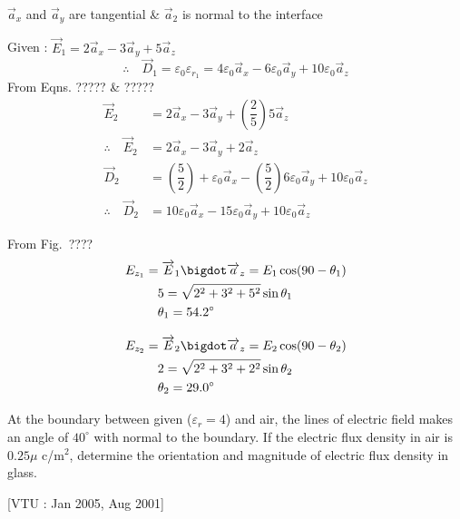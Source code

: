 \begin{solution}
$\overrightarrow{a}_{x}$ and $\overrightarrow{a}_{y}$ are tangential \& $\overrightarrow{a}_{2}$ is normal to the interface

Given : $\overrightarrow{E}_{1} = 2\overrightarrow{a}_{x} - 3\overrightarrow{a}_{y} + 5\overrightarrow{a}_{z}$
$$
\therefore\quad \overrightarrow{D}_{1} = \varepsilon_{0}\varepsilon_{r_{1}} = 4\varepsilon_{0}\overrightarrow{a}_{x} - 6\varepsilon_{0}\overrightarrow{a}_{y} + 10\varepsilon_{0}\overrightarrow{a}_{z}
$$
From Eqns. ????? \& ?????
\begin{align*}
\overrightarrow{E}_{2} & = 2\overrightarrow{a}_{x} - 3\overrightarrow{a}_{y} + \left(\dfrac{2}{5}\right) 5\overrightarrow{a}_{z}\\
\therefore\quad \overrightarrow{E}_{2} & = 2\overrightarrow{a}_{x} - 3\overrightarrow{a}_{y} + 2\overrightarrow{a}_{z}\\
\overrightarrow{D}_{2} & = \left(\dfrac{5}{2}\right) + \varepsilon_{0}\overrightarrow{a}_{x} - \left(\dfrac{5}{2}\right) 6\varepsilon_{0}\overrightarrow{a}_{y} + 10\varepsilon_{0}\overrightarrow{a}_{z}\\
\therefore\quad \overrightarrow{D}_{2} & = 10\varepsilon_{0}\overrightarrow{a}_{x} - 15\varepsilon_{0}\overrightarrow{a}_{y} + 10\varepsilon_{0}\overrightarrow{a}_{z}
\end{align*}

From Fig.~????
\begin{align*}
E_{z_{1}} & = \overrightarrow{E}_{1} \bigdot \overrightarrow{a}_{z} = E_{1} \cos (90 - \theta_{1})\\
&\quad 5 = \sqrt{2^{2} + 3^{2} + 5^{2}} \sin \theta_{1}\\
&\quad \theta_{1} = 54.2^{\circ}\\[0.3cm]
E_{z_{2}} & = \overrightarrow{E}_{2} \bigdot \overrightarrow{a}_{z} = E_{2} \cos (90 - \theta_{2})\\
&\quad 2 = \sqrt{2^{2} + 3^{2} + 2^{2}} \sin \theta_{2}\\
&\quad \theta_{2} = 29.0^{\circ}
\end{align*}
\end{solution}

\begin{problem}
At the boundary between given ($\varepsilon_{r} = 4$) and air, the lines of electric field makes an angle of $40^{\circ}$ with normal to the boundary. If the electric flux density in air is $0.25 \mu$ c/m$^{2}$, determine the orientation and magnitude of electric flux density in glass. 

\hfill [VTU : Jan 2005, Aug 2001]
\end{problem}

